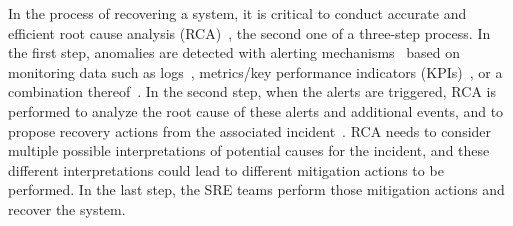 In the process of recovering a system, it is critical to conduct accurate and efficient root cause analysis (RCA)~\cite{sole2017survey}, the second one of a three-step process. In the first step, anomalies are detected with alerting mechanisms~\cite{zhao2020automatically, xu2017lightweight, tang2012optimizing} %
based on monitoring data such as logs~\cite{aguilera2003performance,zawawy2010log,nair2015learning,lu2017log,gan2019seer}, metrics/key performance indicators (KPIs)~\cite{mace2015pivot,xu2018unsupervised,ma2019ms, meng2020localizing, wu2020microrca}, or a combination thereof~\cite{kim2013root,wang2019grano}.  In the second step, when the alerts are triggered, RCA is performed to analyze the root cause of these alerts and additional events, and to propose recovery actions from the associated incident~\cite{baek2017cloudsight,da2016monitoring,aguilera2003performance}. RCA needs to consider multiple possible interpretations of potential causes for the incident, and these different interpretations could lead to different mitigation actions to be performed.  
In the last step, the SRE teams perform those mitigation actions and recover the system. 

